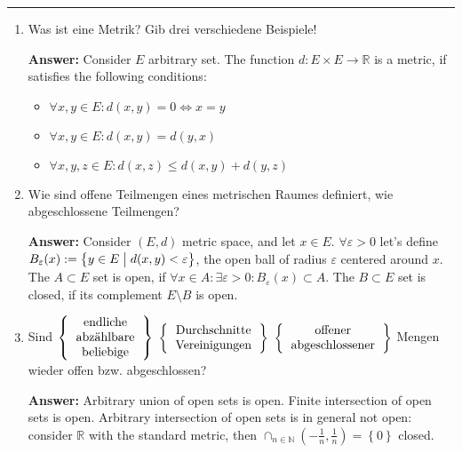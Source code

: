 \documentclass[11pt]{article}
\newcommand{\RR}[0]{\mathbb{R}}
\newcommand{\NN}[0]{\mathbb{N}}
\begin{document}


\medskip\hrule
\begin{enumerate}
    \item Was ist eine Metrik? Gib drei verschiedene Beispiele!

    \textbf{Answer:} Consider $E$ arbitrary set. The function $d: E \times E \to \RR$ is a metric, if satisfies the following conditions:
    \begin{itemize}
        \item $\forall x, y \in E\colon d(x, y) = 0 \Leftrightarrow x = y$
        \item $\forall x, y \in E\colon d(x, y) = d(y, x)$
        \item $\forall x, y, z \in E\colon d(x, z) \le d(x, y) + d(y, z)$
    \end{itemize}
    \item Wie sind offene Teilmengen eines metrischen Raumes definiert, wie abgeschlossene Teilmengen?

    \textbf{Answer:} Consider $(E, d)$ metric space, and let $x \in E$. $\forall \varepsilon > 0$ let's define $B_\varepsilon(x) := \left\{ y \in E \bigm | d(x, y) < \varepsilon\right\}$, the open ball of radius $\varepsilon$ centered around $x$. The $A \subset E$ set is open, if $\forall x \in A\colon \exists \varepsilon > 0\colon B_\varepsilon(x) \subset A$. The $B \subset E$ set is closed, if its complement $E \setminus B$ is open.
    \item Sind $\left\{\begin{tabular}{c}
        endliche\\
        abzählbare\\
        beliebige\\
    \end{tabular}\right\}$ $\left\{\begin{tabular}{c}
    Durchschnitte\\
    Vereinigungen
    \end{tabular}\right\}$ $\left\{\begin{tabular}{c}
        offener\\
        abgeschlossener
    \end{tabular}\right\}$ Mengen wieder offen bzw. abgeschlossen?

    \textbf{Answer:} Arbitrary union of open sets is open. Finite intersection of open sets is open. Arbitrary intersection of open sets is in general not open: consider $\RR$ with the standard metric, then $\cap_{n \in \NN} (-\frac{1}{n}, \frac{1}{n}) = \left\{0\right\}$ closed.


\end{enumerate}
\end{document}
